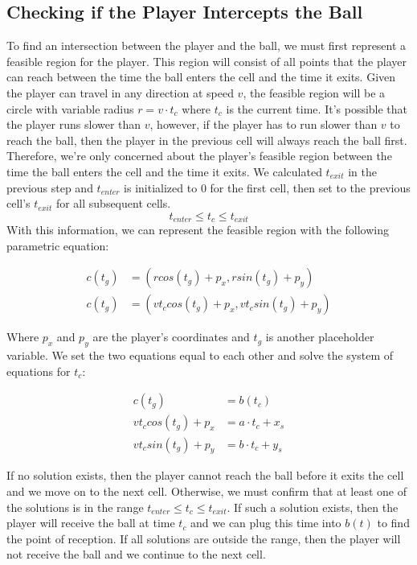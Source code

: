 \documentclass[11pt]{article}
\begin{document}
\subsection*{Checking if the Player Intercepts the Ball}
To find an intersection between the player and the ball, we must first represent a feasible region for the player. This region will consist of all points that the player can reach
between the time the ball enters the cell and the time it exits. Given the player can travel in any direction at speed \(v\), the feasible region will be a circle with variable radius
\(r = v \cdot t_{c}\) where \(t_{c}\) is the current time.
It's possible that the player runs slower than \(v\), however, if the player has to run slower than \(v\) to reach the ball, then the player in the previous cell will always reach the ball first.
Therefore, we're only concerned about the player's feasible region between the time the ball enters the cell and the time it exits. We calculated \(t_{exit}\) in the previous step and
\(t_{enter}\) is initialized to \(0\) for the first cell, then set to the previous cell's \(t_{exit}\) for all subsequent cells.
\begin{equation}
    t_{enter} \leq t_c \leq t_{exit}
\end{equation}
With this information, we can represent the feasible region with the following parametric equation:

\begin{align*}
    c(t_g) &= (r cos(t_g) + p_x, r sin(t_g) + p_y) \\
    c(t_g) &= (v t_{c} cos(t_g) + p_x, v t_{c} sin(t_g) + p_y)
\end{align*}

Where \(p_x\) and \(p_y\) are the player's coordinates and \(t_g\) is another placeholder variable. We set the two equations equal to each other and solve the system of equations for \(t_c\):

\begin{align*}
    c(t_g) &= b(t_c) \\
    v t_{c} cos(t_g) + p_x &= a \cdot t_c + x_s \\
    v t_{c} sin(t_g) + p_y &= b \cdot t_c + y_s
\end{align*}

If no solution exists, then the player cannot reach the ball before it exits the cell and we move on to the next cell. Otherwise, we must confirm that at least one of the solutions is in the range
\(t_{enter} \leq t_c \leq t_{exit}\). If such a solution exists, then the player will receive the ball at time \(t_c\) and we can plug this time into \(b(t)\) to find the point of reception.
If all solutions are outside the range, then the player will not receive the ball and we continue to the next cell.
\end{document}
